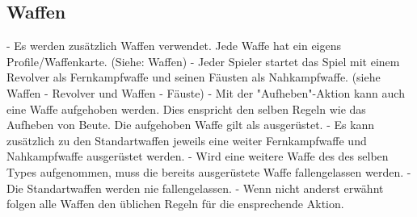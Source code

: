 \subsection{Waffen}

- Es werden zusätzlich Waffen verwendet. Jede Waffe hat ein eigens Profile/Waffenkarte. (Siehe: Waffen)
- Jeder Spieler startet das Spiel mit einem Revolver als Fernkampfwaffe und seinen
  Fäusten als Nahkampfwaffe. (siehe Waffen - Revolver und Waffen - Fäuste)
- Mit der "Aufheben"-Aktion kann auch eine Waffe aufgehoben werden. Dies enspricht den selben Regeln wie
  das Aufheben von Beute. Die aufgehoben Waffe gilt als ausgerüstet.
- Es kann zusätzlich zu den Standartwaffen jeweils eine weiter Fernkampfwaffe und Nahkampfwaffe
  ausgerüstet werden.
- Wird eine weitere Waffe des des selben Types aufgenommen, muss die bereits ausgerüstete Waffe
  fallengelassen werden.
- Die Standartwaffen werden nie fallengelassen.
- Wenn nicht anderst erwähnt folgen alle Waffen den üblichen Regeln für die ensprechende Aktion.